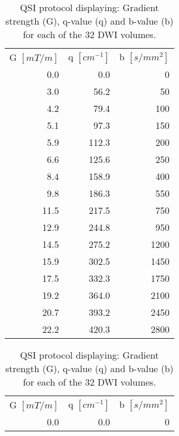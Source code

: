   \begin{table}
      \centering
     \caption{QSI protocol displaying: Gradient strength (G), q-value (q) and b-value (b) for each of the 32 DWI volumes.}
		 \begin{adjustbox}{width={0.47\textwidth},keepaspectratio}
        \begin{tabular}{rrr}
        \addlinespace
            \multicolumn{3}{l}{}\\
        \toprule
            G $[mT/m]$ & q $[cm^{-1}]$ & b $[s/mm^2]$ \\
            \cmidrule(r){1-1}\cmidrule(lr){2-2}\cmidrule(l){3-3}
            0.0   & 0.0   & 0 \\
            3.0   & 56.2  & 50 \\
            4.2   & 79.4  & 100 \\
            5.1   & 97.3  & 150 \\
            5.9   & 112.3 & 200 \\
            6.6   & 125.6 & 250 \\
            8.4   & 158.9 & 400 \\
            9.8   & 186.3 & 550 \\
            11.5  & 217.5 & 750 \\
            12.9  & 244.8 & 950 \\
            14.5  & 275.2 & 1200 \\
            15.9  & 302.5 & 1450 \\
            17.5  & 332.3 & 1750 \\
            19.2  & 364.0 & 2100 \\
            20.7  & 393.2 & 2450 \\
            22.2  & 420.3 & 2800 \\
            \bottomrule
        \end{tabular}%
		 \end{adjustbox}
        \hspace{0.02\textwidth}%
		  \begin{adjustbox}{width={0.47\textwidth},keepaspectratio}
        \begin{tabular}{rrr}
        \addlinespace
            \multicolumn{3}{l}{\textit{... continued}}\\
        \toprule
            G $[mT/m]$ & q $[cm^{-1}]$ & b $[s/mm^2]$ \\
            \cmidrule(r){1-1}\cmidrule(lr){2-2}\cmidrule(l){3-3}
            0.0   & 0.0   & 0 \\

\end{tabular}
\end{adjustbox}
\end{table}

